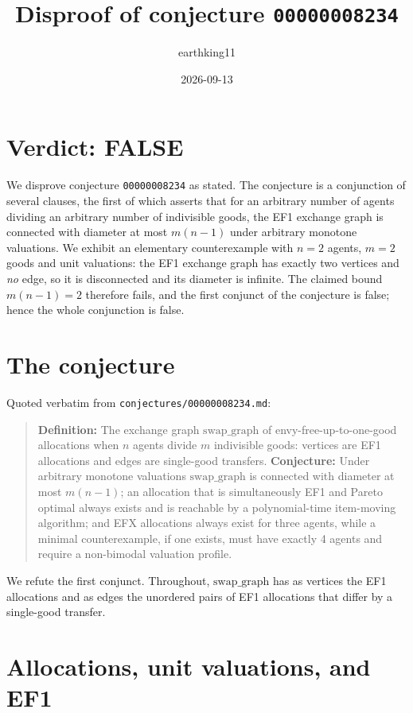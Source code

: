 \documentclass[11pt]{article}
\title{Disproof of conjecture \texttt{00000008234}}
\author{earthking11}
\date{2026-09-13}
\theoremstyle{definition}
\theoremstyle{remark}
\newcommand{\swapgraph}{\mathrm{swap\_graph}}
\begin{document}
\maketitle

\section*{Verdict: FALSE}

We disprove conjecture \texttt{00000008234} as stated. The conjecture is a
conjunction of several clauses, the first of which asserts that for an arbitrary
number of agents dividing an arbitrary number of indivisible goods, the
EF1 exchange graph is connected with diameter at most $m(n-1)$ under arbitrary
monotone valuations. We exhibit an elementary counterexample with $n = 2$ agents,
$m = 2$ goods and unit valuations: the EF1 exchange graph has exactly two
vertices and \emph{no} edge, so it is disconnected and its diameter is infinite.
The claimed bound $m(n-1) = 2$ therefore fails, and the first conjunct of the
conjecture is false; hence the whole conjunction is false.

\section{The conjecture}

Quoted verbatim from \texttt{conjectures/00000008234.md}:

\begin{quote}
\textbf{Definition:} The exchange graph $\swapgraph$ of envy-free-up-to-one-good
allocations when $n$ agents divide $m$ indivisible goods: vertices are EF1
allocations and edges are single-good transfers.
\textbf{Conjecture:} Under arbitrary monotone valuations $\swapgraph$ is
connected with diameter at most $m(n-1)$; an allocation that is simultaneously
EF1 and Pareto optimal always exists and is reachable by a polynomial-time
item-moving algorithm; and EFX allocations always exist for three agents, while
a minimal counterexample, if one exists, must have exactly 4 agents and require a
non-bimodal valuation profile.
\end{quote}

We refute the first conjunct. Throughout, $\swapgraph$ has as vertices the EF1
allocations and as edges the unordered pairs of EF1 allocations that differ by a
single-good transfer.

\section{Allocations, unit valuations, and EF1}
\end{document}
